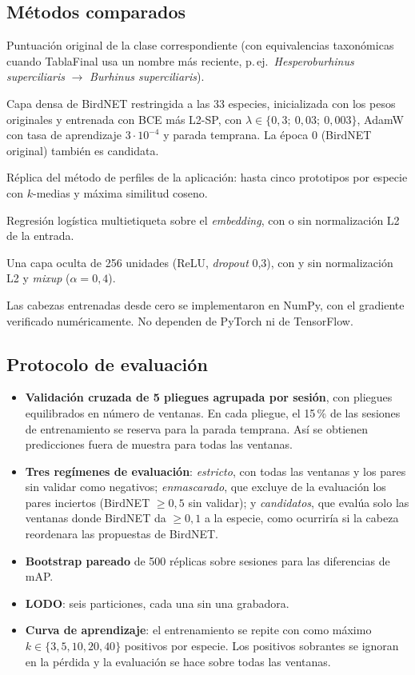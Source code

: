\documentclass[11pt,a4paper]{article}
\newcommand{\spp}[1]{\textit{#1}}
\begin{document}
\subsection{Métodos comparados}
\begin{description}[leftmargin=1em]
  \item[BirdNET sin ajuste.] Puntuación original de la clase correspondiente (con equivalencias taxonómicas cuando TablaFinal usa un nombre más
        reciente, p.\,ej.\ \spp{Hesperoburhinus superciliaris} $\to$ \spp{Burhinus superciliaris}).
  \item[BirdNET afinado.] Capa densa de BirdNET restringida a las 33 especies, inicializada con los pesos originales y entrenada con BCE más L2-SP,
        con $\lambda \in \{0{,}3;\ 0{,}03;\ 0{,}003\}$, AdamW con tasa de aprendizaje $3\cdot 10^{-4}$ y parada temprana. La época 0 (BirdNET original)
        también es candidata.
  \item[Prototipos coseno.] Réplica del método de perfiles de la aplicación: hasta cinco prototipos por especie con $k$-medias y máxima similitud coseno.
  \item[Sonda lineal.] Regresión logística multietiqueta sobre el \emph{embedding}, con o sin normalización L2 de la entrada.
  \item[MLP.] Una capa oculta de 256 unidades (ReLU, \emph{dropout} 0,3), con y sin normalización L2 y \emph{mixup} ($\alpha = 0{,}4$).
\end{description}
Las cabezas entrenadas desde cero se implementaron en NumPy, con el gradiente verificado numéricamente. No dependen de PyTorch ni de TensorFlow.

\subsection{Protocolo de evaluación}
\begin{itemize}
  \item \textbf{Validación cruzada de 5 pliegues agrupada por sesión}, con pliegues equilibrados en número de ventanas. En cada pliegue, el 15\,\% de
        las sesiones de entrenamiento se reserva para la parada temprana. Así se obtienen predicciones fuera de muestra para todas las ventanas.
  \item \textbf{Tres regímenes de evaluación}:
    \emph{estricto}, con todas las ventanas y los pares sin validar como negativos;
    \emph{enmascarado}, que excluye de la evaluación los pares inciertos (BirdNET $\geq 0{,}5$ sin validar);
    y \emph{candidatos}, que evalúa solo las ventanas donde BirdNET da $\geq 0{,}1$ a la especie, como ocurriría si la cabeza
    reordenara las propuestas de BirdNET.
  \item \textbf{Bootstrap pareado} de 500 réplicas sobre sesiones para las diferencias de mAP.
  \item \textbf{LODO}: seis particiones, cada una sin una grabadora.
  \item \textbf{Curva de aprendizaje}: el entrenamiento se repite con como máximo $k \in \{3, 5, 10, 20, 40\}$ positivos por especie.
        Los positivos sobrantes se ignoran en la pérdida y la evaluación se hace sobre todas las ventanas.
\end{itemize}
\end{document}
